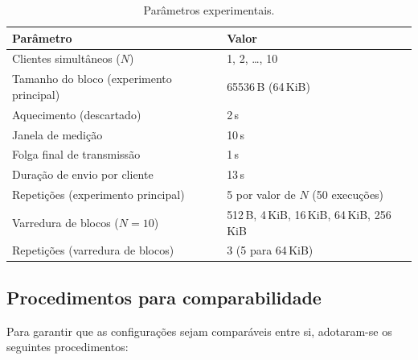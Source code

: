 \documentclass[12pt,a4paper]{article}
\newcommand{\SI}[2]{\mbox{#1\,#2}}
\begin{document}
\begin{table}[H]
\centering
\caption{Parâmetros experimentais.}
\label{tab:params}
\begin{tabular}{ll}
\toprule
\textbf{Parâmetro} & \textbf{Valor}\\
\midrule
Clientes simultâneos ($N$) & 1, 2, \ldots, 10\\
Tamanho do bloco (experimento principal) & \SI{65536}{B} (\SI{64}{KiB})\\
Aquecimento (descartado) & \SI{2}{s}\\
Janela de medição & \SI{10}{s}\\
Folga final de transmissão & \SI{1}{s}\\
Duração de envio por cliente & \SI{13}{s}\\
Repetições (experimento principal) & 5 por valor de $N$ (50 execuções)\\
Varredura de blocos ($N=10$) & \SI{512}{B}, \SI{4}{KiB}, \SI{16}{KiB}, \SI{64}{KiB}, \SI{256}{KiB}\\
Repetições (varredura de blocos) & 3 (5 para \SI{64}{KiB})\\
\bottomrule
\end{tabular}
\end{table}

\subsection{Procedimentos para comparabilidade}

Para garantir que as configurações sejam comparáveis entre si, adotaram-se os
seguintes procedimentos:
\end{document}
